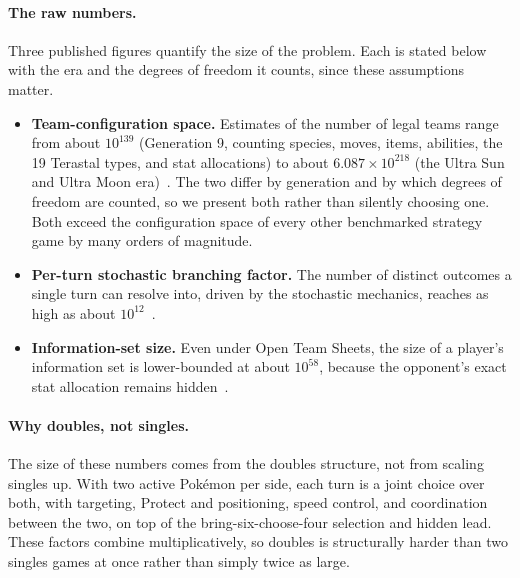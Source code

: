 \paragraph{The raw numbers.}
Three published figures quantify the size of the problem. Each is stated below
with the era and the degrees of freedom it counts, since these assumptions matter.
\begin{itemize}
  \item \textbf{Team-configuration space.} Estimates of the number of legal teams
        range from about $10^{139}$ (Generation 9, counting species, moves, items,
        abilities, the 19 Terastal types, and stat allocations) to about
        $6.087 \times 10^{218}$ (the Ultra Sun and Ultra Moon
        era)~\cite{angliss2026vgcbench,traylor_vgc}. The two differ by generation
        and by which degrees of freedom are counted, so we present both rather
        than silently choosing one. Both exceed the configuration space of every
        other benchmarked strategy game by many orders of magnitude.
  \item \textbf{Per-turn stochastic branching factor.} The number of distinct
        outcomes a single turn can resolve into, driven by the stochastic
        mechanics, reaches as high as about $10^{12}$~\cite{angliss2026vgcbench}.
  \item \textbf{Information-set size.} Even under Open Team Sheets, the size of a
        player's information set is lower-bounded at about $10^{58}$, because the
        opponent's exact stat allocation remains hidden~\cite{angliss2026vgcbench}.
\end{itemize}
\paragraph{Why doubles, not singles.}
The size of these numbers comes from the doubles structure, not from scaling
singles up. With two active Pok\'{e}mon per side, each turn is a joint choice over
both, with targeting, Protect and positioning, speed control, and coordination
between the two, on top of the bring-six-choose-four selection and hidden lead.
These factors combine multiplicatively, so doubles is structurally harder than two
singles games at once rather than simply twice as large.

